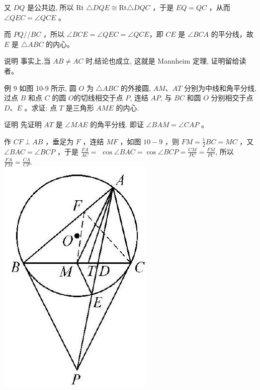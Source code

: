 \documentclass[10pt]{article}
\begin{document}
又 $D Q$ 是公共边, 所以 Rt $\triangle D Q E \cong \mathrm{Rt} \triangle D Q C$ ，于是 $E Q=Q C$ ，从而 $\angle Q E C=\angle Q C E$ 。

而 $P Q / / B C$ ，所以 $\angle B C E=\angle Q E C=\angle Q C E ，$即 $C E$ 是 $\angle B C A$ 的平分线，故 $E$ 是 $\triangle A B C$ 的内心。

说明 事实上,当 $A B \neq A C$ 时,结论也成立, 这就是 Mannheim 定理, 证明留给读者。

例 9 如图 10-9 所示, 圆 $O$ 为 $\triangle A B C$ 的外接圆, $A M 、 A T$ 分别为中线和角平分线, 过点 $B$ 和点 $C$ 的圆 $O$的切线相交于点 $P$, 连结 $A P$, 与 $B C$ 和圆 $O$ 分别相交于点 $D 、 E$ 。求证: 点 $T$ 是三角形 $A M E$ 的内心.

证明 先证明 $A T$ 是 $\angle M A E$ 的角平分线. 即证 $\angle B A M=\angle C A P$ 。

作 $C F \perp A B$ ，垂足为 $F$ ，连结 $M F$ ，如图 $10-9$ ，则 $F M=\frac{1}{2} B C=M C$ ，又 $\angle B A C=\angle B C P$ ，于是 $\frac{F A}{A C}=$ $\cos \angle B A C=\cos \angle B C P=\frac{C M}{P C}=\frac{F M}{P C}$, 所以 $\frac{F A}{F M}=\frac{C A}{C P}$.\\
\includegraphics[max width=\textwidth, center]{2024_10_30_66b8e5e701da2093c133g-076}
\end{document}
